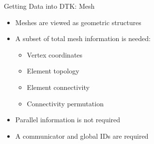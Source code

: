 \documentclass{beamer}
\begin{document}
\begin{frame}{Getting Data into DTK: Mesh}
  
  \begin{itemize}
    \item Meshes are viewed as geometric structures
      \medskip
    \item A subset of total mesh information is needed:
      \medskip
      \begin{itemize}
        \item Vertex coordinates
        \item Element topology
        \item Element connectivity
        \item Connectivity permutation
      \end{itemize}
      \medskip
    \item Parallel information is not required
      \medskip
    \item A communicator and global IDs are required
  \end{itemize}

\end{frame}
\end{document}
